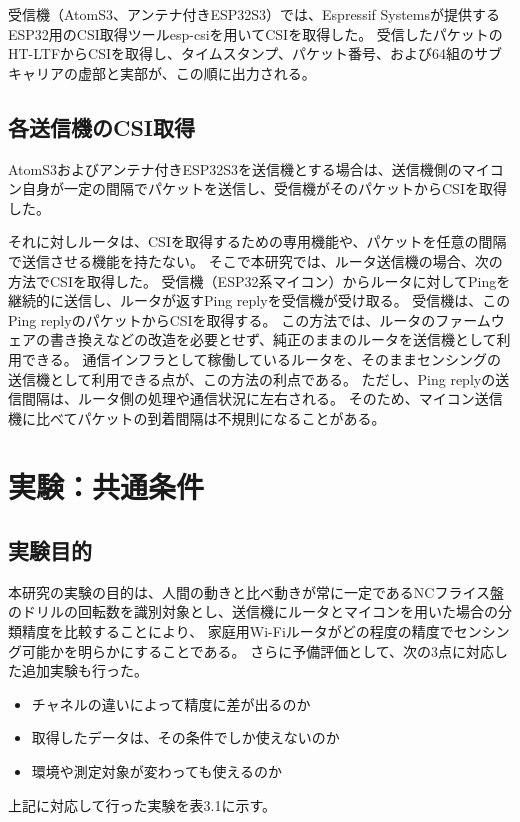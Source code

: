 \documentclass[uplatex, 12pt]{ujbook}
\begin{document}
受信機（AtomS3、アンテナ付きESP32S3）では、Espressif Systemsが提供するESP32用のCSI取得ツールesp-csi\cite{espcsi}を用いてCSIを取得した。
受信したパケットのHT-LTFからCSIを取得し、タイムスタンプ、パケット番号、および64組のサブキャリアの虚部と実部が、この順に出力される。

\section{各送信機のCSI取得}
AtomS3およびアンテナ付きESP32S3を送信機とする場合は、送信機側のマイコン自身が一定の間隔でパケットを送信し、受信機がそのパケットからCSIを取得した。

それに対しルータは、CSIを取得するための専用機能や、パケットを任意の間隔で送信させる機能を持たない。
そこで本研究では、ルータ送信機の場合、次の方法でCSIを取得した。
受信機（ESP32系マイコン）からルータに対してPingを継続的に送信し、ルータが返すPing replyを受信機が受け取る。
受信機は、このPing replyのパケットからCSIを取得する。
この方法では、ルータのファームウェアの書き換えなどの改造を必要とせず、純正のままのルータを送信機として利用できる。
通信インフラとして稼働しているルータを、そのままセンシングの送信機として利用できる点が、この方法の利点である。
ただし、Ping replyの送信間隔は、ルータ側の処理や通信状況に左右される。
そのため、マイコン送信機に比べてパケットの到着間隔は不規則になることがある。

\chapter{実験：共通条件}
\section{実験目的}
本研究の実験の目的は、人間の動きと比べ動きが常に一定であるNCフライス盤のドリルの回転数を識別対象とし、送信機にルータとマイコンを用いた場合の分類精度を比較することにより、
家庭用Wi-Fiルータがどの程度の精度でセンシング可能かを明らかにすることである。
さらに予備評価として、次の3点に対応した追加実験も行った。

\begin{itemize}
  \item チャネルの違いによって精度に差が出るのか
  \item 取得したデータは、その条件でしか使えないのか
  \item 環境や測定対象が変わっても使えるのか
\end{itemize}
上記に対応して行った実験を表3.1に示す。
\end{document}
